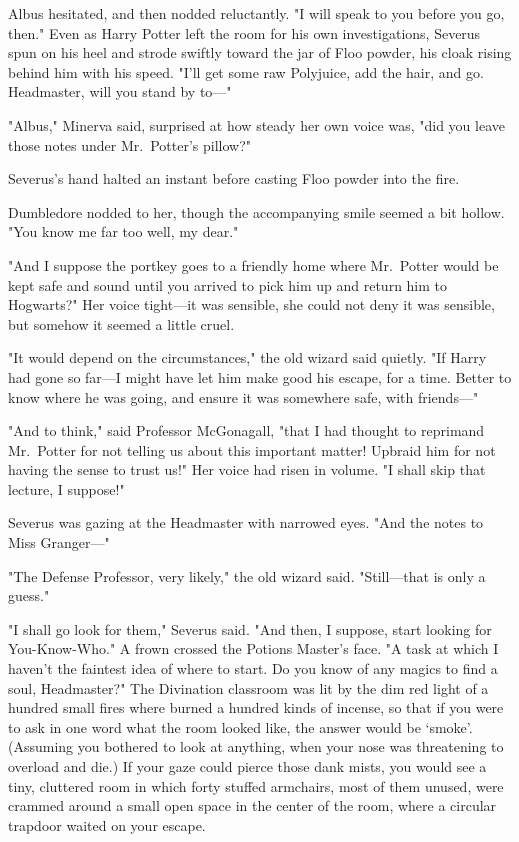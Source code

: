 Albus hesitated, and then nodded reluctantly. "I will speak to you before you 
go, then."
\sbreak
Even as Harry Potter left the room for his own investigations, Severus spun on 
his heel and strode swiftly toward the jar of Floo powder, his cloak rising 
behind him with his speed. "I'll get some raw Polyjuice, add the hair, and go. 
Headmaster, will you stand by to---"

"Albus," Minerva said, surprised at how steady her own voice was, "did you 
leave those notes under Mr.~Potter's pillow?"

Severus's hand halted an instant before casting Floo powder into the fire.

Dumbledore nodded to her, though the accompanying smile seemed a bit hollow. 
"You know me far too well, my dear."

"And I suppose the portkey goes to a friendly home where Mr.~Potter would be 
kept safe and sound until you arrived to pick him up and return him to 
Hogwarts?" Her voice tight---it was sensible, she could not deny it was 
sensible, but somehow it seemed a little cruel.

"It would depend on the circumstances," the old wizard said quietly. "If Harry 
had gone so far---I might have let him make good his escape, for a time. Better 
to know where he was going, and ensure it was somewhere safe, with friends---"

"And to think," said Professor McGonagall, "that I had thought to reprimand 
Mr.~Potter for not telling us about this important matter! Upbraid him for not 
having the sense to trust us!" Her voice had risen in volume. "I shall skip 
that lecture, I suppose!"

Severus was gazing at the Headmaster with narrowed eyes. "And the notes to Miss 
Granger---"

"The Defense Professor, very likely," the old wizard said. "Still---that is 
only a guess."

"I shall go look for them," Severus said. "And then, I suppose, start looking 
for You-Know-Who." A frown crossed the Potions Master's face. "A task at which 
I haven't the faintest idea of where to start. Do you know of any magics to 
find a soul, Headmaster?"
\sbreak
The Divination classroom was lit by the dim red light of a hundred small fires 
where burned a hundred kinds of incense, so that if you were to ask in one word 
what the room looked like, the answer would be `smoke'. (Assuming you bothered 
to look at anything, when your nose was threatening to overload and die.) If 
your gaze could pierce those dank mists, you would see a tiny, cluttered room 
in which forty stuffed armchairs, most of them unused, were crammed around a 
small open space in the center of the room, where a circular trapdoor waited on 
your escape.

